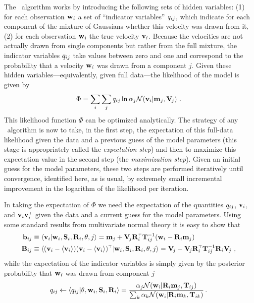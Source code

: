 The \EM\ algorithm works by introducing the following sets of hidden
variables: (1) for each observation $\mathbf{w}_i$ a set of ``indicator
variables'' $q_{ij}$, which indicate for each component of the mixture
of Gaussians whether this velocity was drawn from it, (2) for each
observation $\mathbf{w}_i$ the true velocity $\boldsymbol{\mathbf{v}}_i$. Because the velocities
are not actually drawn from single components but rather from the full
mixture, the indicator variables $q_{ij}$ take values between zero and
one and correspond to the probability that a velocity $\mathbf{w}_i$ was drawn
from a component $j$. Given these hidden variables---equivalently,
given full data---the likelihood of the model is given by
\begin{equation}\label{eq:incompletefulllike}
\Phi = \sum_i \sum_j \qij \ln \alpha_j \normal(\vvi|\mmj,\VVj) \ .
\end{equation}
This likelihood function $\Phi$ can be optimized analytically. The
strategy of any \EM\ algorithm is now to take, in the first step, the
expectation of this full-data likelihood given the data and a previous
guess of the model parameters (this stage is appropriately called the
\emph{expectation step}) and then to maximize this expectation value
in the second step (the \emph{maximization step}). Given an initial
guess for the model parameters, these two steps are performed
iteratively until convergence, identified here, as is usual, by
extremely small incremental improvement in the logarithm of the
likelihood per iteration.

In taking the expectation of $\Phi$ we need the expectation of the
quantities $q_{ij}$, $\boldsymbol{\mathbf{v}}_i$, and $\boldsymbol{\mathbf{v}}_i\boldsymbol{\mathbf{v}}_i^{\scriptscriptstyle \top}$ given the data and a
current guess for the model parameters. Using some standard results
from multivariate normal theory it is easy to show that
\begin{align}
\mathbf{b}_{ij} &\equiv \langle\boldsymbol{\mathbf{v}}_i|\mathbf{w}_i,\mathbf{S}_i,\mathbf{R}_i,\theta,j\rangle = \mathbf{m}_j + \mathbf{V}_{\!j}
\mathbf{R}_i^{\scriptscriptstyle \top}\mathbf{T}_{ij}^{-1} (\mathbf{w}_i - \mathbf{R}_i\mathbf{m}_j)\\
\mathbf{B}_{ij} &\equiv \langle(\boldsymbol{\mathbf{v}}_i-\langle\boldsymbol{\mathbf{v}}_i\rangle)(\boldsymbol{\mathbf{v}}_i-\langle\boldsymbol{\mathbf{v}}_i\rangle)^{\scriptscriptstyle \top}|\mathbf{w}_i,\mathbf{S}_i,\mathbf{R}_i,\theta,j\rangle
= \mathbf{V}_{\!j} - \mathbf{V}_{\!j}\mathbf{R}_i^{\scriptscriptstyle \top} \mathbf{T}_{ij}^{-1}\mathbf{R}_i \mathbf{V}_{\!j} \ ,
\end{align}
while the expectation of the indicator variables is simply given by
the posterior probability that $\mathbf{w}_i$ was drawn from component $j$
\begin{equation}\label{eq:qij}
q_{ij} \leftarrow \langle q_{ij}|\theta,\mathbf{w}_i,\mathbf{S}_i,\mathbf{R}_i\rangle = \frac{\alpha_j \mathcal{N}(\mathbf{w}_i|\mathbf{R}_i\mathbf{m}_j,\mathbf{T}_{ij})}{\sum_k \alpha_k \mathcal{N}(\mathbf{w}_i|\mathbf{R}_i\mathbf{m}_k,\mathbf{T}_{ik})}\, .
\end{equation}

